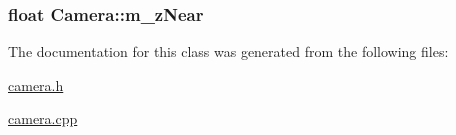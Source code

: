 \hypertarget{class_camera_ae77d866ea9d0aa75853c8243154fca82}{
\subsubsection[{m\+\_\+z\+Near}]{\setlength{\rightskip}{0pt plus 5cm}float Camera\+::m\+\_\+z\+Near\hspace{0.3cm}{\ttfamily [protected]}}}\label{class_camera_ae77d866ea9d0aa75853c8243154fca82}


The documentation for this class was generated from the following files\+:\begin{DoxyCompactItemize}
\item 
\hyperlink{camera_8h}{camera.\+h}\item 
\hyperlink{camera_8cpp}{camera.\+cpp}\end{DoxyCompactItemize}
